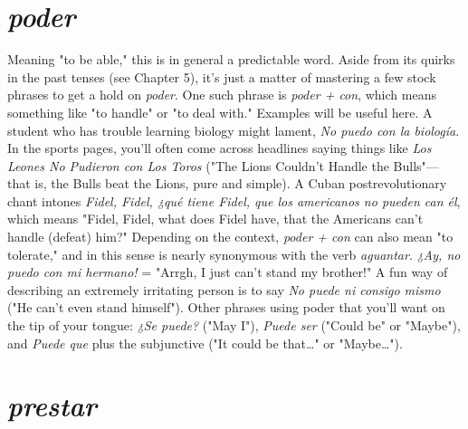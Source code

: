 \documentclass[14pt,a4paper,oneside]{memoir}
\begin{document}
\section{\emph{poder}}

Meaning "to be able," this is in general a predictable word.
Aside from its quirks in the past tenses (see Chapter 5), it's just a matter of mastering a few stock phrases to get a hold on \emph{poder}. One such
phrase is \emph{poder + con}, which means something like "to handle" or "to
deal with." Examples will be useful here. A student who has trouble
learning biology might lament, \emph{No puedo con la biología}. In the sports
pages, you'll often come across headlines saying things like \emph{Los Leones
No Pudieron con Los Toros} ("The Lions Couldn't Handle the Bulls"---
that is, the Bulls beat the Lions, pure and simple). A Cuban postrevolutionary chant intones \emph{Fidel, Fidel, ¿qué tiene Fidel, que los americanos no pueden can él}, which means "Fidel, Fidel, what does Fidel
have, that the Americans can't handle (defeat) him?" Depending on the
context, \emph{poder + con} can also mean "to tolerate," and in this sense is
nearly synonymous with the verb \emph{aguantar}. \emph{¿Ay, no puedo con mi hermano!} = "Arrgh, I just can't stand my brother!" A fun way of describing an extremely irritating person is to say \emph{No puede ni consigo mismo}
("He can't even stand himself"). Other phrases using poder that you'll
want on the tip of your tongue: \emph{¿Se puede?} ("May I"), \emph{Puede ser}
("Could be" or "Maybe"), and \emph{Puede que} plus the subjunctive ("It
could be that\ldots{}" or "Maybe\ldots{}").

\section{\emph{prestar}}
\end{document}
